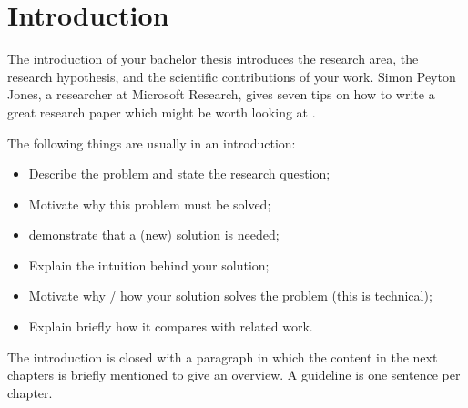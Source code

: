 \chapter{Introduction}\label{introduction}
The introduction of your bachelor thesis introduces the research area, the research hypothesis, and the scientific contributions of your work.
Simon Peyton Jones, a researcher at Microsoft Research, gives seven tips on how to write a great research paper which might be worth looking at
\cite{peyton_2016:HowToWriteAGreatResearchPaper}.

The following things are usually in an introduction:
\begin{itemize}
\item Describe the problem and state the research question;
\item Motivate why this problem must be solved;
\item demonstrate that a (new) solution is needed;
\item Explain the intuition behind your solution;
\item Motivate why / how your solution solves the problem (this is technical);
\item Explain briefly how it compares with related work.
\end{itemize}
%
The introduction is closed with a paragraph in which the content in the next chapters is briefly mentioned to give an overview. A guideline is one sentence per chapter. 

